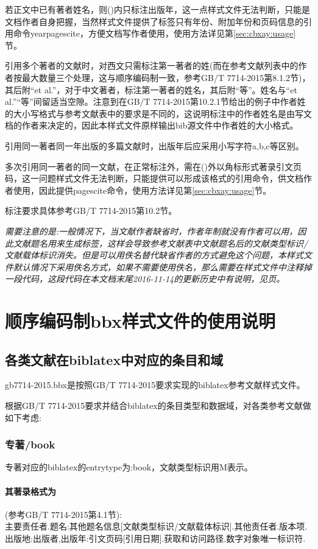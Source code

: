 若正文中已有著者姓名，则()内只标注出版年，这一点样式文件无法判断，只能是文档作者自身把握，当然样式文件提供了标签只有年份、附加年份和页码信息的引用命令yearpagescite，方便文档写作者使用，使用方法详见第\ref{sec:cbxay:usage}节。

引用多个著者的文献时，对西文只需标注第一著者的姓(而在参考文献列表中的作者按最大数量三个处理，这与顺序编码制一致，参考GB/T 7714-2015第8.1.2节)，其后附“et al.”，对于中文著者，标注第一著者的姓名，其后附“等”。姓名与“et al.”“等”间留适当空隙。注意到在GB/T 7714-2015第10.2.1节给出的例子中作者姓的大小写格式与参考文献表中的要求是不同的，这说明标注中的作者姓名是由写文档的作者来决定的，因此本样式文件原样输出bib源文件中作者姓的大小格式。

引用同一著者同一年出版的多篇文献时，出版年后应采用小写字符a,b,c等区别。

多次引用同一著者的同一文献，在正常标注外，需在()外以角标形式著录引文页码，这一问题样式文件无法判断，只能提供可以形成该格式的引用命令，供文档作者使用，因此提供pagescite命令，使用方法详见第\ref{sec:cbxay:usage}节。

标注要求具体参考GB/T 7714-2015第10.2节。

\emph{需要注意的是:一般情况下，当文献作者缺省时，作者年制就没有作者可以用，因此文献题名用来生成标签，这样会导致参考文献表中文献题名后的文献类型标识/文献载体标识消失。但是可以用佚名替代缺省作者的方式避免这个问题，本样式文件默认情况下采用佚名方式，如果不需要使用佚名，那么需要在样式文件中注释掉一段代码，这段代码在本文档末尾2016-11-14的更新历史中有说明，见\pageref{up:20161114}页。}


\section{顺序编码制bbx样式文件的使用说明}

\subsection{各类文献在biblatex中对应的条目和域}\label{sec:numeric:data}
gb7714-2015.bbx是按照GB/T 7714-2015要求实现的biblatex参考文献样式文件。

根据GB/T 7714-2015要求并结合biblatex的条目类型和数据域，对各类参考文献做如下考虑:
\subsubsection{专著/book}
\begin{refentry}{}{}
专著对应的biblatex的entrytype为:book，文献类型标识用M表示。

\paragraph{其著录格式为}(参考GB/T 7714-2015第4.1节):\\
主要责任者.题名:其他题名信息[文献类型标识/文献载体标识].其他责任者.版本项.出版地:出版者,出版年:引文页码[引用日期].获取和访问路径.数字对象唯一标识符.
\end{refentry}

